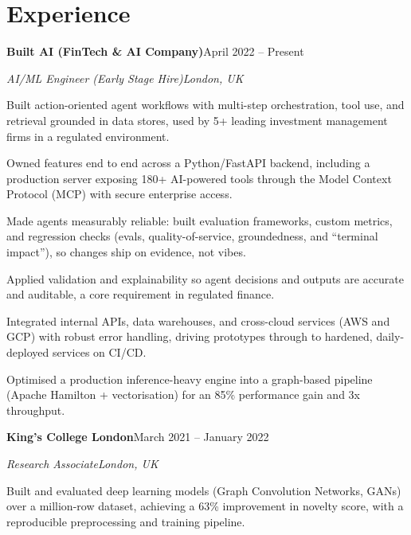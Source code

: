 \documentclass[10pt,a4paper]{article}
\newcommand{\entry}[4]{%
  {\color{company}\bfseries #1}\hfill {\color{muted}#2}\par
  \vspace{1pt}
  {\itshape #3}\hfill {\color{muted}\itshape #4}\par
  \vspace{3pt}%
}
\begin{document}
\section{Experience}
\entry{Built AI (FinTech \& AI Company)}{April 2022 -- Present}{AI/ML Engineer (Early Stage Hire)}{London, UK}
\begin{tight}
  \item Built action-oriented agent workflows with multi-step orchestration, tool use, and retrieval grounded in data stores, used by 5+ leading investment management firms in a regulated environment.
  \item Owned features end to end across a Python/FastAPI backend, including a production server exposing 180+ AI-powered tools through the Model Context Protocol (MCP) with secure enterprise access.
  \item Made agents measurably reliable: built evaluation frameworks, custom metrics, and regression checks (evals, quality-of-service, groundedness, and ``terminal impact''), so changes ship on evidence, not vibes.
  \item Applied validation and explainability so agent decisions and outputs are accurate and auditable, a core requirement in regulated finance.
  \item Integrated internal APIs, data warehouses, and cross-cloud services (AWS and GCP) with robust error handling, driving prototypes through to hardened, daily-deployed services on CI/CD.
  \item Optimised a production inference-heavy engine into a graph-based pipeline (Apache Hamilton + vectorisation) for an 85\% performance gain and 3x throughput.
\end{tight}

\entry{King's College London}{March 2021 -- January 2022}{Research Associate}{London, UK}
\begin{tight}
  \item Built and evaluated deep learning models (Graph Convolution Networks, GANs) over a million-row dataset, achieving a 63\% improvement in novelty score, with a reproducible preprocessing and training pipeline.
\end{tight}

\end{document}

